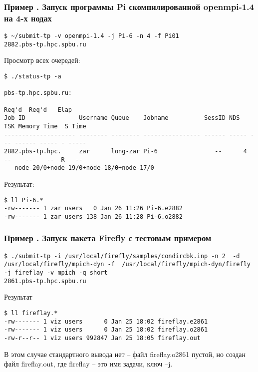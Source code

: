 \documentclass[a4paper,8pt]{extreport}
\newcounter{ex}
\begin{document}
\subsubsection{Пример . Запуск программы Pi скомпилированной openmpi-1.4 на 4-х нодах}
\begin{lstlisting}
$ ~/submit-tp -v openmpi-1.4 -j Pi-6 -n 4 -f Pi01 
2882.pbs-tp.hpc.spbu.ru
\end{lstlisting}

Просмотр всех очередей: 
\begin{lstlisting}
$ ./status-tp -a

pbs-tp.hpc.spbu.ru: 
                                                                         Req'd  Req'd   Elap
Job ID               Username Queue    Jobname          SessID NDS   TSK Memory Time  S Time
-------------------- -------- -------- ---------------- ------ ----- --- ------ ----- - -----
2882.pbs-tp.hpc.     zar      long-zar Pi-6                --      4  --    --    --  R   -- 
   node-20/0+node-19/0+node-18/0+node-17/0
\end{lstlisting}

Результат:
\begin{lstlisting}
$ ll Pi-6.*
-rw------- 1 zar users   0 Jan 26 11:26 Pi-6.e2882
-rw------- 1 zar users 138 Jan 26 11:28 Pi-6.o2882
\end{lstlisting}

\subsubsection{Пример . Запуск пакета Firefly с тестовым примером}
\begin{lstlisting}
$ ./submit-tp -i /usr/local/firefly/samples/condircbk.inp -n 2  -d /usr/local/firefly/mpich-dyn -f  /usr/local/firefly/mpich-dyn/firefly -j fireflay -v mpich -q short
2861.pbs-tp.hpc.spbu.ru
\end{lstlisting}

Результат
\begin{lstlisting}
$ ll fireflay.*
-rw------- 1 viz users      0 Jan 25 18:02 fireflay.e2861
-rw------- 1 viz users      0 Jan 25 18:02 fireflay.o2861
-rw-r--r-- 1 viz users 992847 Jan 25 18:05 fireflay.out
\end{lstlisting}

В этом случае стандартного вывода нет – файл fireflay.o2861 пустой, но создан файл fireflay.out, где fireflay – это имя задачи, ключ –j.
\end{document}
